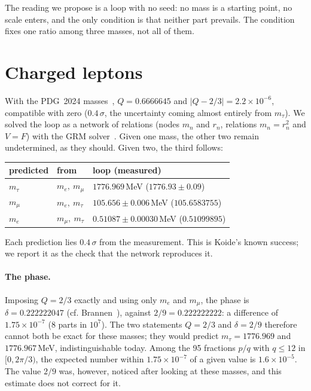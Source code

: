 \documentclass[11pt,a4paper]{article}
\begin{document}
The reading we propose is a loop with no seed: no mass is a starting point, no scale enters, and the only condition is
that neither part prevails. The condition fixes one ratio among three masses, not all of them.

\section{Charged leptons}
With the PDG~2024 masses~\cite{pdg}, $Q=0.6666645$ and $|Q-2/3|=2.2\times10^{-6}$, compatible with zero
($0.4\,\sigma$, the uncertainty coming almost entirely from $m_\tau$). We solved the loop as a network of relations
(nodes $m_n$ and $r_n$, relations $m_n=r_n^2$ and $V=F$) with the GRM solver~\cite{grm}. Given one mass, the other
two remain undetermined, as they should. Given two, the third follows:
\begin{center}
\begin{tabular}{lll}
\toprule
predicted & from & loop \quad (measured) \\
\midrule
$m_\tau$ & $m_e,\ m_\mu$ & $1776.969$\,MeV \quad ($1776.93\pm0.09$) \\
$m_\mu$ & $m_e,\ m_\tau$ & $105.656\pm0.006$\,MeV \quad ($105.6583755$) \\
$m_e$ & $m_\mu,\ m_\tau$ & $0.51087\pm0.00030$\,MeV \quad ($0.51099895$) \\
\bottomrule
\end{tabular}
\end{center}
Each prediction lies $0.4\,\sigma$ from the measurement. This is Koide's known success; we report it as the check
that the network reproduces it.

\paragraph{The phase.} Imposing $Q=2/3$ exactly and using only $m_e$ and $m_\mu$, the phase is
$\delta=0.222222047$ (cf. Brannen~\cite{brannen}), against $2/9=0.222222222$: a difference of $1.75\times10^{-7}$
(8 parts in $10^7$). The two statements $Q=2/3$ and $\delta=2/9$ therefore cannot both be exact for these masses; they
would predict $m_\tau=1776.969$ and $1776.967$\,MeV, indistinguishable today. Among the 95 fractions $p/q$ with
$q\le12$ in $[0,2\pi/3)$, the expected number within $1.75\times10^{-7}$ of a given value is $1.6\times10^{-5}$.
The value $2/9$ was, however, noticed after looking at these masses, and this estimate does not correct for it.
\end{document}
